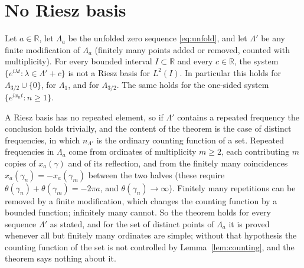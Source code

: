 \documentclass[11pt]{article}
\newcommand{\R}{\mathbb{R}}
\newcommand{\Lam}{\Lambda}
\begin{document}
\section{No Riesz basis}\label{sec:main}

\begin{theorem}\label{thm:main}
Let $a\in\R$, let $\Lam_a$ be the unfolded zero sequence \eqref{eq:unfold}, and let $\Lam'$ be any finite modification of $\Lam_a$ (finitely many points added or removed, counted with multiplicity). For every bounded interval $I\subset\R$ and every $c\in\R$, the system $\{e^{i\lambda t}:\lambda\in\Lam'+c\}$ is not a Riesz basis for $L^2(I)$. In particular this holds for $\Lam_{3/2}\cup\{0\}$, for $\Lam_1$, and for $\Lam_{3/2}$. The same holds for the one-sided system $\{e^{ix_nt}:n\ge1\}$.
\end{theorem}

A Riesz basis has no repeated element, so if $\Lam'$ contains a repeated frequency the conclusion holds trivially, and the content of the theorem is the case of distinct frequencies, in which $n_{\Lam'}$ is the ordinary counting function of a set. Repeated frequencies in $\Lam_a$ come from ordinates of multiplicity $m\ge2$, each contributing $m$ copies of $x_a(\gamma)$ and of its reflection, and from the finitely many coincidences $x_a(\gamma_n)=-x_a(\gamma_m)$ between the two halves (these require $\theta(\gamma_n)+\theta(\gamma_m)=-2\pi a$, and $\theta(\gamma_n)\to\infty$). Finitely many repetitions can be removed by a finite modification, which changes the counting function by a bounded function; infinitely many cannot. So the theorem holds for every sequence $\Lam'$ as stated, and for the set of distinct points of $\Lam_a$ it is proved whenever all but finitely many ordinates are simple; without that hypothesis the counting function of the set is not controlled by Lemma~\ref{lem:counting}, and the theorem says nothing about it.
\end{document}
